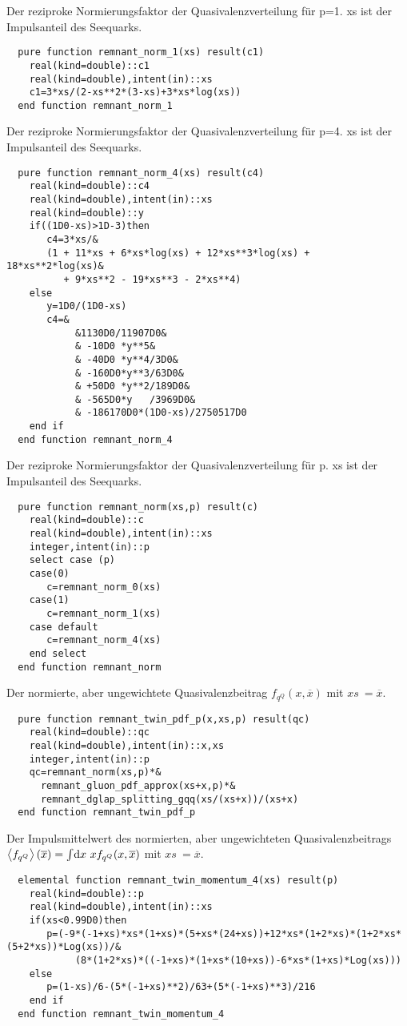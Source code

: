 Der reziproke Normierungsfaktor der Quasivalenzverteilung für p=1. xs ist der Impulsanteil des Seequarks.
\begin{Verbatim}
  pure function remnant_norm_1(xs) result(c1)
    real(kind=double)::c1
    real(kind=double),intent(in)::xs
    c1=3*xs/(2-xs**2*(3-xs)+3*xs*log(xs))
  end function remnant_norm_1
\end{Verbatim}

Der reziproke Normierungsfaktor der Quasivalenzverteilung für p=4. xs ist der Impulsanteil des Seequarks.
\begin{Verbatim}
  pure function remnant_norm_4(xs) result(c4)
    real(kind=double)::c4
    real(kind=double),intent(in)::xs
    real(kind=double)::y
    if((1D0-xs)>1D-3)then
       c4=3*xs/&
       (1 + 11*xs + 6*xs*log(xs) + 12*xs**3*log(xs) + 18*xs**2*log(xs)&
          + 9*xs**2 - 19*xs**3 - 2*xs**4)
    else
       y=1D0/(1D0-xs)
       c4=&
            &1130D0/11907D0&
            & -10D0 *y**5&
            & -40D0 *y**4/3D0&
            & -160D0*y**3/63D0&
            & +50D0 *y**2/189D0&
            & -565D0*y   /3969D0&
            & -186170D0*(1D0-xs)/2750517D0
    end if
  end function remnant_norm_4
\end{Verbatim}

Der reziproke Normierungsfaktor der Quasivalenzverteilung für p. xs ist der Impulsanteil des Seequarks.
\begin{Verbatim}
  pure function remnant_norm(xs,p) result(c)
    real(kind=double)::c
    real(kind=double),intent(in)::xs
    integer,intent(in)::p
    select case (p)
    case(0)
       c=remnant_norm_0(xs)
    case(1)
       c=remnant_norm_1(xs)
    case default
       c=remnant_norm_4(xs)
    end select
  end function remnant_norm
\end{Verbatim}

Der normierte, aber ungewichtete Quasivalenzbeitrag $f_{q^Q}(x,\overline{x})$ mit $xs\ =\overline{x}$.
\begin{Verbatim}
  pure function remnant_twin_pdf_p(x,xs,p) result(qc)
    real(kind=double)::qc
    real(kind=double),intent(in)::x,xs
    integer,intent(in)::p
    qc=remnant_norm(xs,p)*&
      remnant_gluon_pdf_approx(xs+x,p)*&
      remnant_dglap_splitting_gqq(xs/(xs+x))/(xs+x)
  end function remnant_twin_pdf_p
\end{Verbatim}
  
Der Impulsmittelwert des normierten, aber ungewichteten Quasivalenzbeitrags $\left<f_{q^Q}\right>(\overline{x})=\int\!\operatorname{d}\!x\ x f_{q^Q}(x,\overline{x})$ mit $xs\ =\overline{x}$.
\begin{Verbatim}
  elemental function remnant_twin_momentum_4(xs) result(p)
    real(kind=double)::p
    real(kind=double),intent(in)::xs
    if(xs<0.99D0)then
       p=(-9*(-1+xs)*xs*(1+xs)*(5+xs*(24+xs))+12*xs*(1+2*xs)*(1+2*xs*(5+2*xs))*Log(xs))/&
            (8*(1+2*xs)*((-1+xs)*(1+xs*(10+xs))-6*xs*(1+xs)*Log(xs)))
    else
       p=(1-xs)/6-(5*(-1+xs)**2)/63+(5*(-1+xs)**3)/216
    end if
  end function remnant_twin_momentum_4
\end{Verbatim}

